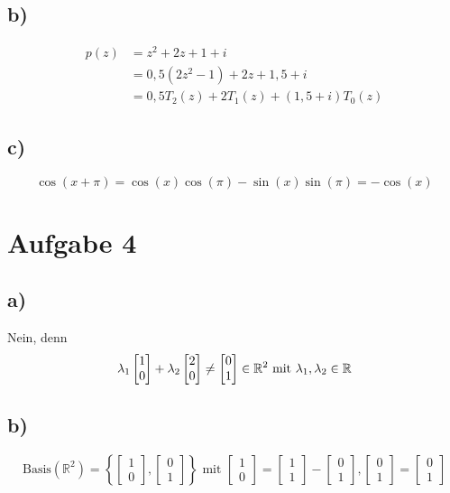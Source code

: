 \documentclass[a4paper, 11pt]{article}
\begin{document}
\subsection{b)}
\label{sec:org7ac08d5}
\begin{align*}
    p(z) &= z^2 + 2z + 1 + i \\
    &= 0,5(2z^2 - 1) + 2z + 1,5 + i \\
    &= 0,5T_2(z) + 2T_1(z) + (1,5 + i)T_0(z)
\end{align*}

\subsection{c)}
\label{sec:orgd7e906d}
$$ \cos(x + \pi) = \cos(x)\cos(\pi) - \sin(x)\sin(\pi) = -\cos(x) $$

\section{Aufgabe 4}
\label{sec:org25f4c60}
\subsection{a)}
\label{sec:orge55b814}
Nein, denn
$$ \lambda_1\begin{bmatrix} 1 \\ 0\end{bmatrix} + \lambda_2\begin{bmatrix} 2 \\ 0\end{bmatrix} \ne \begin{bmatrix} 0 \\ 1\end{bmatrix} \in \mathbb{R}^2 \text{ mit } \lambda_1, \lambda_2 \in \mathbb{R} $$

\subsection{b)}
\label{sec:orgf4eaaec}
$$ \text{Basis}(\mathbb{R}^2 ) = \left\{ \begin{bmatrix} 1 \\ 0\end{bmatrix}, \begin{bmatrix} 0 \\ 1\end{bmatrix} \right\}
\text{ mit } \begin{bmatrix} 1 \\ 0\end{bmatrix} =
\begin{bmatrix} 1 \\ 1\end{bmatrix} - \begin{bmatrix} 0 \\ 1\end{bmatrix}, \begin{bmatrix} 0 \\ 1\end{bmatrix} = \begin{bmatrix} 0 \\ 1\end{bmatrix} $$
\end{document}
